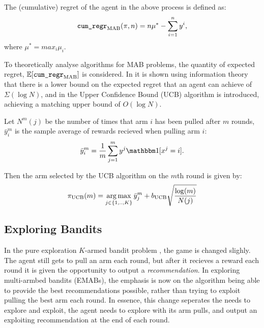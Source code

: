     \begin{defn}
        The \textnormal{(cumulative) regret} of the agent in the above process is defined as:
        \begin{align}
            {\textnormal{\texttt{cum\_regr}}}_{{\textnormal{MAB}}}(\pi,n) = n\mu^* - \sum_{i=1}^n y^i,
        \end{align}
        where $\mu^* = max_i \mu_i$.
    \end{defn}

    To theoretically analyse algorithms for MAB problems, the quantity of expected regret, $\mathbb{E}[{\textnormal{\texttt{cum\_regr}}}_{{\textnormal{MAB}}}]$ is considered. In  it is shown using information theory that there is a lower bound on the expected regret that an agent can achieve of $\Sigma(\log N)$, and in  the Upper Confidence Bound (UCB) algorithm is introduced, achieving a matching upper bound of $O(\log N)$. 

    Let $N^m(j)$ be the number of times that arm $i$ has been pulled after $m$ rounds, $\bar{y}_i^m$ is the sample average of rewards recieved when pulling arm $i$: 
    \begin{align}
        \bar{y}_i^m=\frac{1}{m}\sum_{j=1}^m y^j \one[x^j=i].
    \end{align} 
    
    Then the arm selected by the UCB algorithm on the $m$th round is given by:
    \begin{align}
        \pi_{{\textnormal{UCB}}}(m) = \operatorname*{arg\,max}_{j\in\{1,..,K\}} \bar{y}_j^m + b_{{\textnormal{UCB}}} \sqrt{\frac{\log(m)}{N(j)}} 
    \end{align}







    \subsection{Exploring Bandits}
    \label{sec:2-3-1-exploring-mab}

        In the pure exploration $K$-armed bandit problem ,
        the game is changed slighly. The agent still gets to pull an arm each round, but after it recieves a reward each round it is given the opportunity to output a \textit{recommendation}. In exploring multi-armbed bandits (EMABs), the emphasis is now on the algorithm being able to provide the best recommendations possible, rather than trying to exploit pulling the best arm each round. In essence, this change seperates the needs to explore and exploit, the agent needs to explore with its arm pulls, and output an exploiting recommendation at the end of each round.

